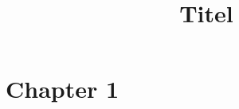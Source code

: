 \documentclass[fourColumns]{formularyETH/formularyETH}
\title{Titel}
\begin{document}
  \section{Chapter 1}
  \label{sec:chapter1}

% 
  
\end{document}
